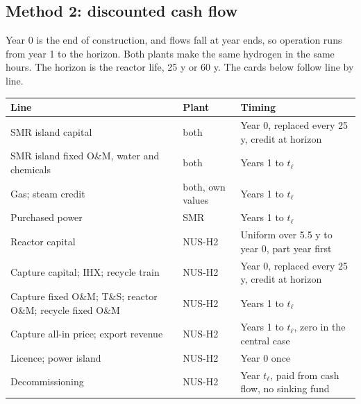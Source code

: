 \subsection*{Method 2: discounted cash flow}
Year 0 is the end of construction, and flows fall at year ends, so operation runs from year 1 to the horizon. Both plants make the same hydrogen in the same hours. The horizon is the reactor life, 25 y or 60 y. The cards below follow  line by line.

\begin{center}\small
\begin{tabular}{@{}>{\raggedright\arraybackslash}p{7.0cm}>{\raggedright\arraybackslash}p{1.9cm}>{\raggedright\arraybackslash}p{7.0cm}@{}}
\toprule
Line & Plant & Timing\\
\midrule
SMR island capital & both & Year 0, replaced every 25 y, credit at horizon\\
SMR island fixed O\&M, water and chemicals & both & Years 1 to $t_\ell$\\
Gas; steam credit & both, own values & Years 1 to $t_\ell$\\
Purchased power & SMR & Years 1 to $t_\ell$\\
Reactor capital & NUS-H2 & Uniform over 5.5 y to year 0, part year first\\
Capture capital; IHX; recycle train & NUS-H2 & Year 0, replaced every 25 y, credit at horizon\\
Capture fixed O\&M; T\&S; reactor O\&M; recycle fixed O\&M & NUS-H2 & Years 1 to $t_\ell$\\
Capture all-in price; export revenue & NUS-H2 & Years 1 to $t_\ell$, zero in the central case\\
Licence; power island & NUS-H2 & Year 0 once\\
Decommissioning & NUS-H2 & Year $t_\ell$, paid from cash flow, no sinking fund\\
\bottomrule
\end{tabular}
\end{center}

